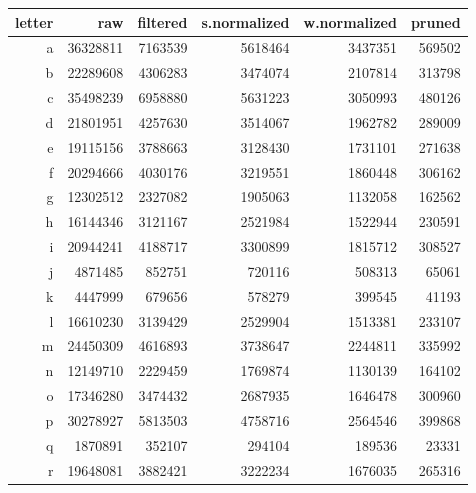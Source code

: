 \FloatBarrier
\begin{table}[ht]
    \centering
    \begin{tabularx}{\textwidth}{r R R R R R}
        \toprule
        letter & raw & filtered & s.normalized & w.normalized & pruned\\
        \midrule
        a & \num{36328811} & \num{7163539} & \num{5618464} & \num{3437351} & \num{569502}\\
        b & \num{22289608} & \num{4306283} & \num{3474074} & \num{2107814} & \num{313798}\\
        c & \num{35498239} & \num{6958880} & \num{5631223} & \num{3050993} & \num{480126}\\
        d & \num{21801951} & \num{4257630} & \num{3514067} & \num{1962782} & \num{289009}\\
        e & \num{19115156} & \num{3788663} & \num{3128430} & \num{1731101} & \num{271638}\\
        f & \num{20294666} & \num{4030176} & \num{3219551} & \num{1860448} & \num{306162}\\
        g & \num{12302512} & \num{2327082} & \num{1905063} & \num{1132058} & \num{162562}\\
        h & \num{16144346} & \num{3121167} & \num{2521984} & \num{1522944} & \num{230591}\\
        i & \num{20944241} & \num{4188717} & \num{3300899} & \num{1815712} & \num{308527}\\
        j & \num{4871485} & \num{852751} & \num{720116} & \num{508313} & \num{65061}\\
        k & \num{4447999} & \num{679656} & \num{578279} & \num{399545} & \num{41193}\\
        l & \num{16610230} & \num{3139429} & \num{2529904} & \num{1513381} & \num{233107}\\
        m & \num{24450309} & \num{4616893} & \num{3738647} & \num{2244811} & \num{335992}\\
        n & \num{12149710} & \num{2229459} & \num{1769874} & \num{1130139} & \num{164102}\\
        o & \num{17346280} & \num{3474432} & \num{2687935} & \num{1646478} & \num{300960}\\
        p & \num{30278927} & \num{5813503} & \num{4758716} & \num{2564546} & \num{399868}\\
        q & \num{1870891} & \num{352107} & \num{294104} & \num{189536} & \num{23331}\\
        r & \num{19648081} & \num{3882421} & \num{3222234} & \num{1676035} & \num{265316}\\

\end{tabularx}
\end{table}
